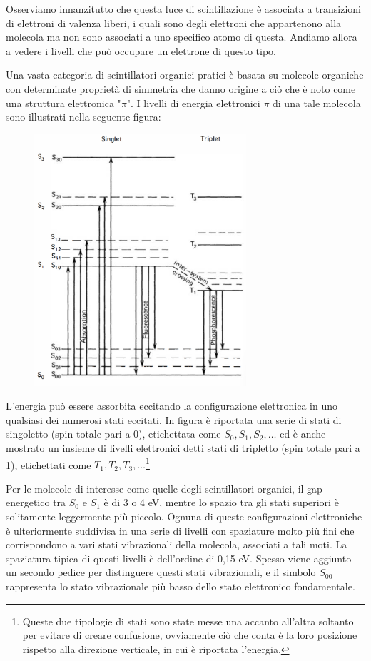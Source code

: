 Osserviamo innanzitutto che questa luce di scintillazione è associata a transizioni di elettroni di valenza liberi, i quali sono degli elettroni che appartenono alla molecola ma non sono associati a uno specifico atomo di questa. Andiamo allora a vedere i livelli che può occupare un elettrone di questo tipo.

Una vasta categoria di scintillatori organici pratici è basata su molecole organiche con determinate proprietà di simmetria che danno origine a ciò che è noto come una struttura elettronica "$\pi$". I livelli di energia elettronici $\pi$ di una tale molecola sono illustrati nella seguente figura:
\begin{figure}[H]
   \centering
   \includegraphics[width=0.7\textwidth]{immagini/Livelli_energetici_scintillatori_organici.png}
\end{figure}
L'energia può essere assorbita eccitando la configurazione elettronica in uno qualsiasi dei numerosi stati eccitati. In figura è riportata una serie di stati di singoletto (spin totale pari a 0), etichettata come $S_0, S_1, S_2, \ldots$ ed è anche mostrato un insieme di livelli elettronici detti stati di tripletto (spin totale pari a 1), etichettati come $T_1, T_2, T_3, \ldots$\footnote{Queste due tipologie di stati sono state messe una accanto all'altra soltanto per evitare di creare confusione, ovviamente ciò che conta è la loro posizione rispetto alla direzione verticale, in cui è riportata l'energia.}

Per le molecole di interesse come quelle degli scintillatori organici, il gap energetico tra $S_0$ e $S_1$ è di 3 o 4 eV, mentre lo spazio tra gli stati superiori è solitamente leggermente più piccolo. Ognuna di queste configurazioni elettroniche è ulteriormente suddivisa in una serie di livelli con spaziature molto più fini che corrispondono a vari stati vibrazionali della molecola, associati a tali moti. La spaziatura tipica di questi livelli è dell'ordine di 0,15 eV. Spesso viene aggiunto un secondo pedice per distinguere questi stati vibrazionali, e il simbolo $S_{00}$ rappresenta lo stato vibrazionale più basso dello stato elettronico fondamentale.

